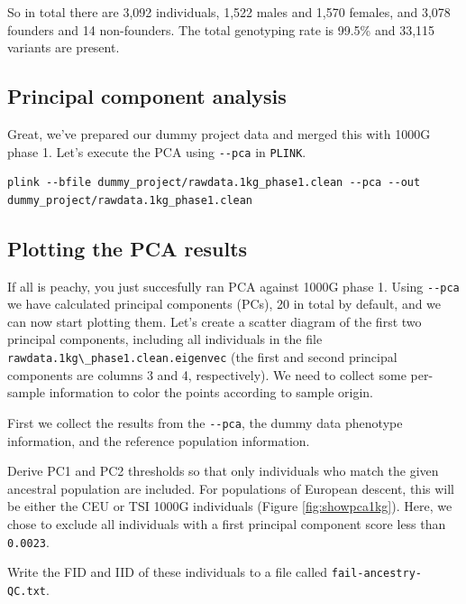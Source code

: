 \documentclass[
]{book}
\newcommand{\passthrough}[1]{#1}
\begin{document}
So in total there are 3,092 individuals, 1,522 males and 1,570 females, and 3,078 founders and 14 non-founders. The total genotyping rate is 99.5\% and 33,115 variants are present.

\hypertarget{principal-component-analysis}{%
\subsection{Principal component analysis}\label{principal-component-analysis}}

Great, we've prepared our dummy project data and merged this with 1000G phase 1. Let's execute the PCA using \passthrough{\lstinline!--pca!} in \passthrough{\lstinline!PLINK!}.

\begin{lstlisting}
plink --bfile dummy_project/rawdata.1kg_phase1.clean --pca --out dummy_project/rawdata.1kg_phase1.clean
\end{lstlisting}

\hypertarget{plotting-the-pca-results}{%
\subsection{Plotting the PCA results}\label{plotting-the-pca-results}}

If all is peachy, you just succesfully ran PCA against 1000G phase 1. Using \passthrough{\lstinline!--pca!} we have calculated principal components (PCs), 20 in total by default, and we can now start plotting them. Let's create a scatter diagram of the first two principal components, including all individuals in the file \passthrough{\lstinline!rawdata.1kg\_phase1.clean.eigenvec!} (the first and second principal components are columns 3 and 4, respectively). We need to collect some per-sample information to color the points according to sample origin.

First we collect the results from the \passthrough{\lstinline!--pca!}, the dummy data phenotype information, and the reference population information.

Derive PC1 and PC2 thresholds so that only individuals who match the given ancestral population are included. For populations of European descent, this will be either the CEU or TSI 1000G individuals (Figure \ref{fig:showpca1kg}). Here, we chose to exclude all individuals with a first principal component score less than \passthrough{\lstinline!0.0023!}.

Write the FID and IID of these individuals to a file called \passthrough{\lstinline!fail-ancestry-QC.txt!}.
\end{document}
